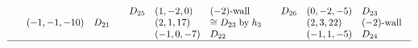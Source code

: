 $$\begin{array}{lll}
\begin{array}{lll}
   &(-1,-1,-10) &\textrm{$D_{21}$}
\end{array}
&
\begin{array}{lll}
D_{25} &(1,-2,0) &\textrm{$(-2)$-wall}\\ 
   &(2,1,17) &\cong D_{23}\;\textrm{by}\; h_{3}\\ 
   &(-1,0,-7) &\textrm{$D_{22}$}
\end{array}
&
\begin{array}{lll}
D_{26} &(0,-2,-5) &\textrm{$D_{23}$}\\ 
   &(2,3,22) &\textrm{$(-2)$-wall}\\ 
   &(-1,1,-5) &D_{24}
\end{array}
\\ 
\hline
\end{array}
$$

